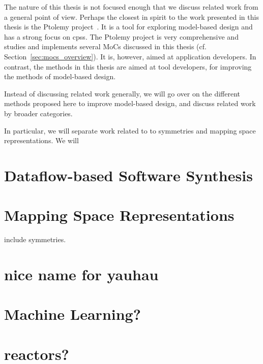 The nature of this thesis is not focused enough that we discuss related work from a general point of view.
Perhaps the closest in spirit to the work presented in this thesis is the Ptolemy project~\cite{Ptolemaeus:14:SystemDesign}.
It is a tool for exploring model-based design and has a strong focus on \acp{cps}.
The Ptolemy project is very comprehensive and studies and implements several \acp{MoC} discussed in this thesis (cf. Section~\ref{sec:mocs_overview}).
It is, however, aimed at application developers. In contrast, the methods in this thesis are aimed at tool developers, for improving the methods of model-based design.

Instead of discussing related work generally, we will go over on the different methods proposed here to improve model-based design, and discuss related work by broader categories.

In particular, we will separate work related to  to symmetries and mapping space representations. We will 
\section{Dataflow-based Software Synthesis}
\cite{casale2013turnus}

\section{Mapping Space Representations}
include symmetries.

\section{nice name for yauhau}

\section{Machine Learning?}

\section{reactors?}